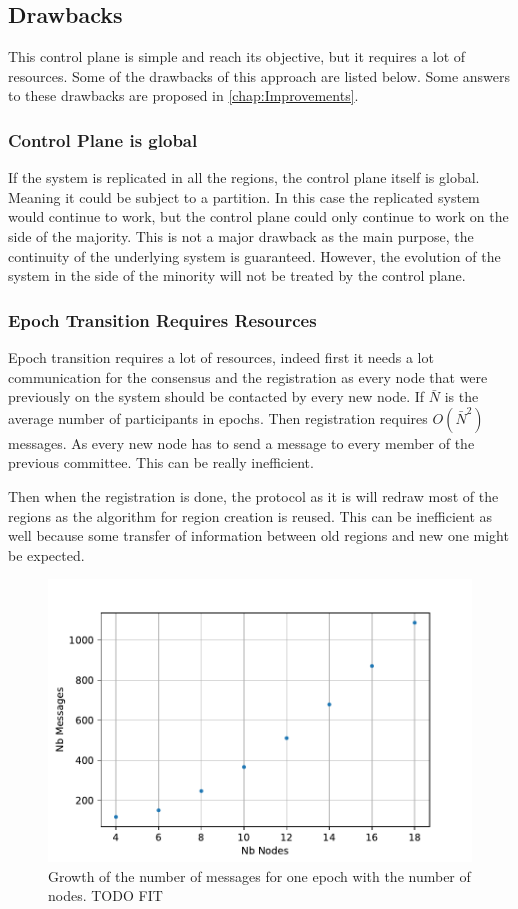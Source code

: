 \documentclass[a4paper,11pt,oneside]{report}
\begin{document}
\subsection{Drawbacks}
This control plane is simple and reach its objective, but it requires a lot of
resources. Some of the drawbacks of this approach are listed below. 
Some answers to these drawbacks are proposed in \autoref{chap:Improvements}.  

\subsubsection{Control Plane is global}
If the system is replicated in all the regions, the control plane itself is
global. Meaning it could be subject to a partition. In this case the replicated
system would continue to work, but the control plane could only continue to
work on the side of the majority. This is not a major drawback as the main
purpose, the continuity of the underlying system is guaranteed. However, the evolution of the system in the side of the minority will not be treated by the control plane.

\subsubsection{Epoch Transition Requires Resources}
Epoch transition requires a lot of resources, indeed first it needs a lot
communication for the consensus and the registration as every node that were
previously on the system should be contacted by every new node. If $\bar{N}$ is
the average number of participants in epochs. Then registration 
requires $O(\bar{N}^2)$ messages. As every new node has to send a message
to every member of the previous committee. This can be really inefficient. 

Then when the registration is done, the protocol as it is will redraw most of
the regions as the algorithm for region creation is reused. This can be
inefficient as well because some transfer of information between old regions and new one might be expected.

\begin{figure}[!h] 
\centering
\includegraphics[width=350pt]{figures/messages-plot}
\caption{Growth of the number of messages for one epoch with the number of nodes. \color{red} TODO FIT \color{black}}
\label{fig:messages-plot}
\end{figure}
\end{document}
